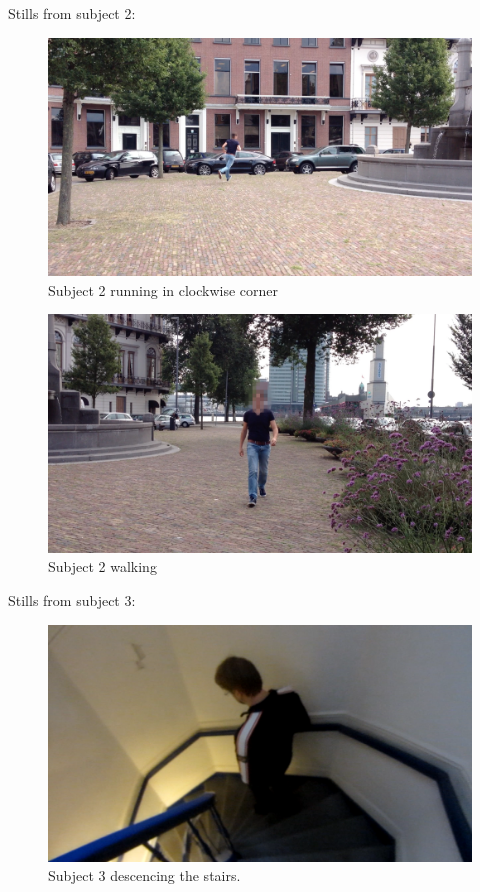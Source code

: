Stills from subject 2:

\begin{figure}
\centering
  \includegraphics[width=1\textwidth]{./Figures/chapter6/data_collection/stills/roemer_run_cw.png}
  \caption[Recording still 6]{Subject 2 running in clockwise corner}
  \label{fig:data_gathering_still_2_run}
\end{figure}

\begin{figure}
\centering
  \includegraphics[width=1\textwidth]{./Figures/chapter6/data_collection/stills/roemer_walk.png}
  \caption[Recording still 7]{Subject 2 walking}
  \label{fig:data_gathering_still_2_walk}
\end{figure}

Stills from subject 3:

\begin{figure}
\centering
  \includegraphics[width=1\textwidth]{./Figures/chapter6/data_collection/stills/marc_downstairs.png}
  \caption[Recording still 8]{Subject 3 descencing the stairs.}
  \label{fig:data_gathering_still_3_descending}
\end{figure}

